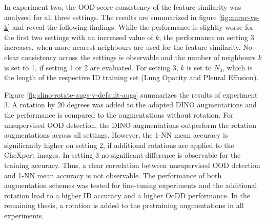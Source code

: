 \par
In experiment two, the OOD score consistency of the feature similarity was analysed for all three settings.
The results are summarized in figure \ref{fig:auroc-vs-k} and reveal the following findings:
While the performance is slightly worse for the first two settings with an increased value of $k$, the performance on setting 3 increases, when more nearest-neighbours are used for the feature similarity.
No clear consistency across the settings is observable and the number of neighbours $k$ is set to 1, if setting 1 or 2 are evaluated. 
For setting 3, $k$ is set to $N_3$, which is the length of the respective ID training set (Lung Opacity and Pleural Effusion).
\par
Figure \ref{fig:dino-rotate-augs-v-default-augs} summarizes the results of experiment 3. 
A rotation by 20 degrees was added to the adopted DINO augmentations and the performance is compared to the augmentations without rotation.
For unsupervised OOD detection, the DINO augmentations outperform the rotation augmentations across all settings.
However, the 1-NN mean accuracy is significantly higher on setting 2, if additional rotations are applied to the CheXpert images.
In setting 3 no significant difference is observable for the training accuracy.
Thus, a clear correlation between unsupervised OOD detection and 1-NN mean accuracy is not observable.
The performance of both augmentation schemes was tested for fine-tuning experiments and the additional rotation lead to a higher ID accuracy and a higher OoDD performance. 
In the remaining thesis, a rotation is added to the pretraining augmentations in all experiments.

